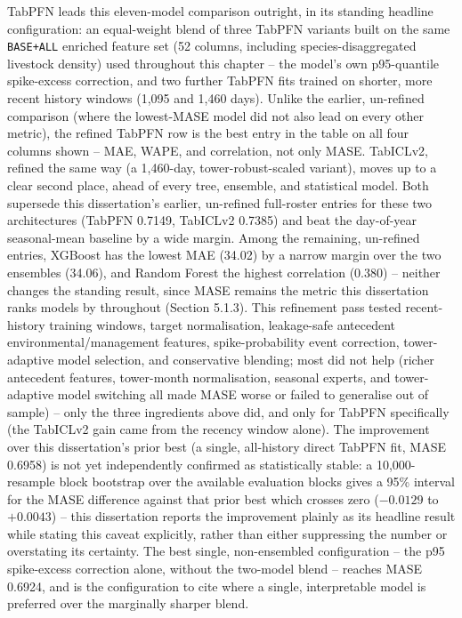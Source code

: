 TabPFN leads this eleven-model comparison outright, in its standing headline configuration: an
equal-weight blend of three TabPFN variants built on the same \texttt{BASE+ALL} enriched feature set
(52 columns, including species-disaggregated livestock density) used throughout this chapter -- the
model's own p95-quantile spike-excess correction, and two further TabPFN fits trained on shorter,
more recent history windows (1,095 and 1,460 days). Unlike the earlier, un-refined comparison (where
the lowest-MASE model did not also lead on every other metric), the refined TabPFN row is the best
entry in the table on all four columns shown -- MAE, WAPE, and correlation, not only MASE. TabICLv2,
refined the same way (a 1,460-day, tower-robust-scaled variant), moves up to a clear second place,
ahead of every tree, ensemble, and statistical model. Both supersede this dissertation's earlier,
un-refined full-roster entries for these two architectures (TabPFN 0.7149, TabICLv2 0.7385) and beat
the day-of-year seasonal-mean baseline by a wide margin. Among the remaining, un-refined entries,
XGBoost has the lowest MAE (34.02) by a narrow margin over the two ensembles (34.06), and Random
Forest the highest correlation (0.380) -- neither changes the standing result, since MASE remains
the metric this dissertation ranks models by throughout (Section 5.1.3).
This refinement pass tested recent-history training windows, target normalisation, leakage-safe
antecedent
environmental/management features, spike-probability event correction, tower-adaptive model
selection, and conservative blending; most did not help (richer antecedent features, tower-month
normalisation, seasonal experts, and tower-adaptive model switching all made MASE worse or failed to
generalise out of sample) -- only the three ingredients above did, and only for TabPFN specifically
(the TabICLv2 gain came from the recency window alone). The improvement over this dissertation's
prior best (a single, all-history direct TabPFN fit, MASE 0.6958) is not yet independently confirmed
as statistically stable: a 10,000-resample block bootstrap over the available evaluation blocks gives
a 95\% interval for the MASE difference against that prior best which crosses zero ($-0.0129$ to
$+0.0043$) -- this dissertation reports the improvement plainly as its headline result while stating
this caveat explicitly, rather than either suppressing the number or overstating its certainty. The
best single, non-ensembled configuration -- the p95 spike-excess correction alone, without the
two-model blend -- reaches MASE 0.6924, and is the configuration to cite where a single, interpretable
model is preferred over the marginally sharper blend.

